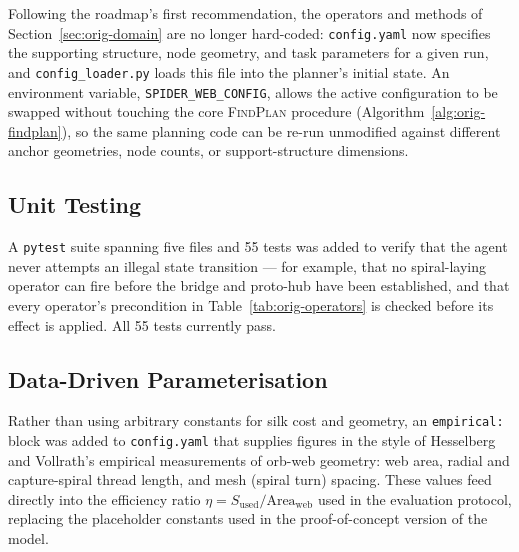 Following the roadmap's first recommendation, the operators and methods of Section~\ref{sec:orig-domain} are no longer hard-coded: \texttt{config.yaml} now specifies the supporting structure, node geometry, and task parameters for a given run, and \texttt{config\_loader.py} loads this file into the planner's initial state. An environment variable, \texttt{SPIDER\_WEB\_CONFIG}, allows the active configuration to be swapped without touching the core \textsc{FindPlan} procedure (Algorithm~\ref{alg:orig-findplan}), so the same planning code can be re-run unmodified against different anchor geometries, node counts, or support-structure dimensions.

\subsection{Unit Testing}
\label{sec:orig-unittest}

A \texttt{pytest} suite spanning five files and 55 tests was added to verify that the agent never attempts an illegal state transition --- for example, that no spiral-laying operator can fire before the bridge and proto-hub have been established, and that every operator's precondition in Table~\ref{tab:orig-operators} is checked before its effect is applied. All 55 tests currently pass.

\subsection{Data-Driven Parameterisation}
\label{sec:orig-datadriven}

Rather than using arbitrary constants for silk cost and geometry, an \texttt{empirical:} block was added to \texttt{config.yaml} that supplies figures in the style of Hesselberg and Vollrath's empirical measurements of orb-web geometry: web area, radial and capture-spiral thread length, and mesh (spiral turn) spacing. These values feed directly into the efficiency ratio $\eta = S_{\mathrm{used}}/\mathrm{Area}_{\mathrm{web}}$ used in the evaluation protocol, replacing the placeholder constants used in the proof-of-concept version of the model.

